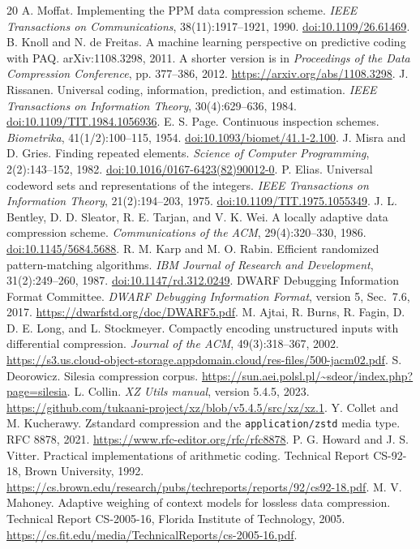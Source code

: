 \documentclass[10pt,letterpaper]{article}
\newcommand{\code}[1]{\texttt{#1}}
\begin{document}
\begin{thebibliography}{20}
 A. Moffat. Implementing the PPM data compression scheme. \emph{IEEE Transactions on Communications}, 38(11):1917--1921, 1990. \href{https://doi.org/10.1109/26.61469}{doi:10.1109/26.61469}.
 B. Knoll and N. de Freitas. A machine learning perspective on predictive coding with PAQ. arXiv:1108.3298, 2011. A shorter version is in \emph{Proceedings of the Data Compression Conference}, pp. 377--386, 2012. \url{https://arxiv.org/abs/1108.3298}.
 J. Rissanen. Universal coding, information, prediction, and estimation. \emph{IEEE Transactions on Information Theory}, 30(4):629--636, 1984. \href{https://doi.org/10.1109/TIT.1984.1056936}{doi:10.1109/TIT.1984.1056936}.
 E. S. Page. Continuous inspection schemes. \emph{Biometrika}, 41(1/2):100--115, 1954. \href{https://doi.org/10.1093/biomet/41.1-2.100}{doi:10.1093/biomet/41.1-2.100}.
 J. Misra and D. Gries. Finding repeated elements. \emph{Science of Computer Programming}, 2(2):143--152, 1982. \href{https://doi.org/10.1016/0167-6423(82)90012-0}{doi:10.1016/0167-6423(82)90012-0}.
 P. Elias. Universal codeword sets and representations of the integers. \emph{IEEE Transactions on Information Theory}, 21(2):194--203, 1975. \href{https://doi.org/10.1109/TIT.1975.1055349}{doi:10.1109/TIT.1975.1055349}.
 J. L. Bentley, D. D. Sleator, R. E. Tarjan, and V. K. Wei. A locally adaptive data compression scheme. \emph{Communications of the ACM}, 29(4):320--330, 1986. \href{https://doi.org/10.1145/5684.5688}{doi:10.1145/5684.5688}.
 R. M. Karp and M. O. Rabin. Efficient randomized pattern-matching algorithms. \emph{IBM Journal of Research and Development}, 31(2):249--260, 1987. \href{https://doi.org/10.1147/rd.312.0249}{doi:10.1147/rd.312.0249}.
 DWARF Debugging Information Format Committee. \emph{DWARF Debugging Information Format}, version 5, Sec.~7.6, 2017. \url{https://dwarfstd.org/doc/DWARF5.pdf}.
 M. Ajtai, R. Burns, R. Fagin, D. D. E. Long, and L. Stockmeyer. Compactly encoding unstructured inputs with differential compression. \emph{Journal of the ACM}, 49(3):318--367, 2002. \url{https://s3.us.cloud-object-storage.appdomain.cloud/res-files/500-jacm02.pdf}.
 S. Deorowicz. Silesia compression corpus. \url{https://sun.aei.polsl.pl/~sdeor/index.php?page=silesia}.
 L. Collin. \emph{XZ Utils manual}, version 5.4.5, 2023. \url{https://github.com/tukaani-project/xz/blob/v5.4.5/src/xz/xz.1}.
 Y. Collet and M. Kucherawy. Zstandard compression and the \code{application/zstd} media type. RFC 8878, 2021. \url{https://www.rfc-editor.org/rfc/rfc8878}.
 P. G. Howard and J. S. Vitter. Practical implementations of arithmetic coding. Technical Report CS-92-18, Brown University, 1992. \url{https://cs.brown.edu/research/pubs/techreports/reports/92/cs92-18.pdf}.
 M. V. Mahoney. Adaptive weighing of context models for lossless data compression. Technical Report CS-2005-16, Florida Institute of Technology, 2005. \url{https://cs.fit.edu/media/TechnicalReports/cs-2005-16.pdf}.
\end{thebibliography}
\endgroup
\end{document}
